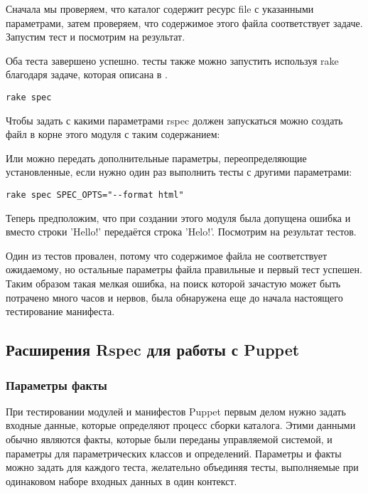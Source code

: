 

Сначала мы проверяем, что каталог содержит ресурс file с указанными параметрами, затем проверяем, что содержимое этого файла соответствует задаче. Запустим тест и посмотрим на результат.


Оба теста завершено успешно. тесты также можно запустить используя rake благодаря задаче, которая описана в .

\begin{verbatim}
rake spec
\end{verbatim}

Чтобы задать с какими параметрами rspec должен запускаться можно создать файл  в корне этого модуля с таким содержанием:


Или можно передать дополнительные параметры, переопределяющие установленные, если нужно один раз выполнить тесты с другими параметрами:

\begin{verbatim}
rake spec SPEC_OPTS="--format html"
\end{verbatim}

Теперь предположим, что при создании этого модуля была допущена ошибка и вместо строки 'Hello!' передаётся строка 'Helo!'. Посмотрим на результат тестов.


Один из тестов провален, потому что содержимое файла не соответствует ожидаемому, но остальные параметры файла правильные и первый тест успешен. Таким образом такая мелкая ошибка, на поиск которой зачастую может быть потрачено много часов и нервов, была обнаружена еще до начала настоящего тестирование манифеста.

\subsection{Расширения Rspec для работы с Puppet}

\subsubsection{Параметры факты}

При тестировании модулей и манифестов Puppet первым делом нужно задать входные данные, которые определяют процесс сборки каталога. Этими данными обычно являются факты, которые были переданы управляемой системой, и параметры для параметрических классов и определений. Параметры и факты можно задать для каждого теста, желательно объединяя тесты, выполняемые при одинаковом наборе входных данных в один контекст.

